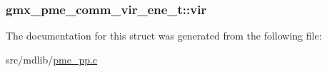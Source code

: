 \hypertarget{structgmx__pme__comm__vir__ene__t_a81a853ce717ef829bc211cb022b5fec8}{
\subsubsection[{vir}]{ {\bf gmx\-\_\-pme\-\_\-comm\-\_\-vir\-\_\-ene\-\_\-t\-::vir}}}\label{structgmx__pme__comm__vir__ene__t_a81a853ce717ef829bc211cb022b5fec8}


\-The documentation for this struct was generated from the following file\-:\begin{DoxyCompactItemize}
\item 
src/mdlib/\hyperlink{pme__pp_8c}{pme\-\_\-pp.\-c}\end{DoxyCompactItemize}
